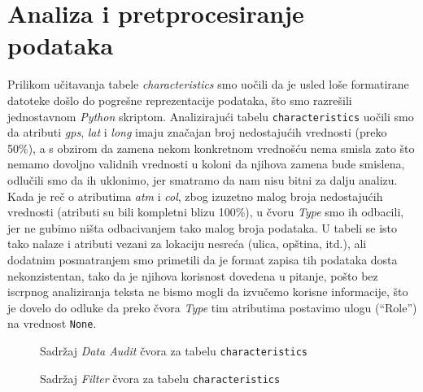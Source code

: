 \documentclass[a4paper,10pt]{article}
\begin{document}
\section{Analiza i pretprocesiranje podataka}
Prilikom učitavanja tabele \textit{characteristics} smo uočili da je usled loše formatirane datoteke došlo do pogrešne reprezentacije podataka, što smo razrešili jednostavnom \textit{Python} skriptom.
Analizirajući tabelu \texttt{characteristics} uočili smo da atributi \textit{gps}, \textit{lat} i \textit{long} imaju značajan broj 
nedostajućih vrednosti (preko 50\%), a s obzirom da zamena nekom konkretnom vrednošću nema smisla zato što nemamo dovoljno validnih vrednosti u koloni da njihova zamena bude smislena,
odlučili smo da ih uklonimo, jer smatramo da nam nisu bitni za dalju analizu. Kada je reč o atributima \textit{atm} i \textit{col}, 
zbog izuzetno malog broja nedostajućih vrednosti (atributi su bili kompletni blizu 100\%), u čvoru \textit{Type} smo ih odbacili, 
jer ne gubimo ništa odbacivanjem tako malog broja podataka. U tabeli se isto tako nalaze i atributi vezani za lokaciju nesreća (ulica, opština, itd.),
ali dodatnim posmatranjem smo primetili da je format zapisa tih podataka dosta nekonzistentan, tako da je njihova korisnost dovedena u pitanje,
pošto bez iscrpnog analiziranja teksta ne bismo mogli da izvučemo korisne informacije, što je dovelo do odluke da preko čvora \textit{Type} 
tim atributima postavimo ulogu (``Role'') na vrednost \texttt{None}.

\begin{figure}[h]
 \centering
 \caption{Sadržaj \textit{Data Audit} čvora za tabelu \texttt{characteristics}}
\end{figure}

\begin{figure}[h]
 \centering
 \caption{Sadržaj \textit{Filter} čvora za tabelu \texttt{characteristics}}
\end{figure}
\end{document}
